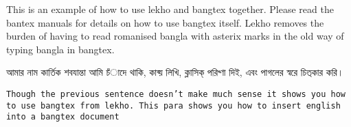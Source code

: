 \documentclass[12pt]{barticle}
\begin{document}
This is an example of how to use lekho and bangtex together. Please read the bantex manuals for details on how to use bangtex itself. Lekho removes the burden of having to read romanised bangla with asterix marks in the old way of typing bangla in bangtex.
 
\bng
আমার নাম {\LBng কার্তিক শবযান্তা} আমি চঁাদে থাকি, কাব্য় লিখি, ক্লাসিক্‌ পরিখ্ণা দিই, এবং পাগলের স্বরে চিত্‌কার করি। 

{\tt Though the previous sentence doesn't make much sense it shows you how to use bangtex from lekho. This para shows you how to insert english into a bangtex document}
\end{document}
